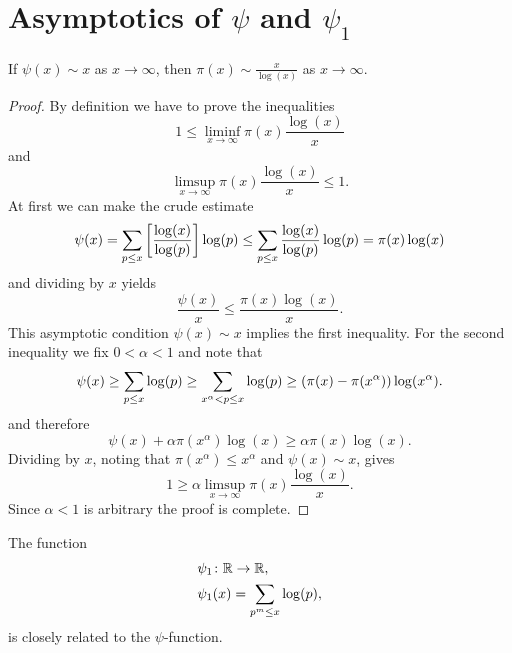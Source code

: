 \section{Asymptotics of $\psi$ and $\psi_1$}


\begin{lemma}
	If $\psi(x) \sim x$ as $x \to \infty$, then $\pi(x) \sim \frac{x}{\log(x)}$ as $x \to \infty$.
\end{lemma}
\begin{proof}
	By definition we have to prove the inequalities
\begin{equation*}
	1 \leq \liminf _{x \to \infty} \pi(x) \frac{\log(x)}{x}
\end{equation*}
	and
\begin{equation*}
	\limsup _{x \to \infty} \pi(x) \frac{\log(x)}{x} \leq 1.
\end{equation*}
	At first we can make the crude estimate
\begin{equation*}
	\psi(x) = \sum _{p \leq x} \left[\frac{\log(x)}{\log(p)}\right] \log(p) \leq \sum _{p \leq x} \frac{\log(x)}{\log(p)} \log(p) = \pi(x) \log(x)
\end{equation*}
	and dividing by $x$ yields
\begin{equation*}
	\frac{\psi(x)}{x} \leq \frac{\pi(x) \log(x)}{x}.
\end{equation*}
	This asymptotic condition $\psi(x) \sim x$ implies the first inequality. For the second inequality we fix $0 < \alpha < 1$ and note that
\begin{equation*}
	\psi(x) \geq \sum _{p \leq x} \log(p) \geq \sum _{x^\alpha < p \leq x} \log(p) \geq \left(\pi(x) - \pi(x^\alpha)\right) \log(x^\alpha).
\end{equation*}
	and therefore
\begin{equation*}
	\psi(x) + \alpha \pi(x^\alpha) \log(x) \geq \alpha \pi(x) \log(x).
\end{equation*}
	Dividing by $x$, noting that $\pi(x^\alpha) \leq x^\alpha$ and $\psi(x) \sim x$, gives
\begin{equation*}
	1 \geq \alpha \limsup _{x \to \infty} \pi(x) \frac{\log(x)}{x}.
\end{equation*}
	Since $\alpha < 1$ is arbitrary the proof is complete.
\end{proof}


\begin{definition}
	The function
\begin{equation*}
\begin{aligned}
	&\psi_1 \colon \mathbb{R} \to \mathbb{R}, \\
	&\psi_1(x) = \sum _{p^m \leq x} \log(p),
\end{aligned}
\end{equation*}
	is closely related to the $\psi$-function.
\end{definition}


